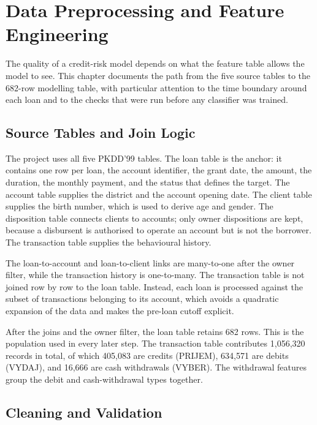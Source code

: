 \chapter{Data Preprocessing and Feature Engineering}
\label{ch:preprocessing}

The quality of a credit-risk model depends on what the feature table allows the model to see. This chapter documents the path from the five source tables to the 682-row modelling table, with particular attention to the time boundary around each loan and to the checks that were run before any classifier was trained.

\section{Source Tables and Join Logic}
\label{sec:source-join}

The project uses all five PKDD'99 tables. The loan table is the anchor: it contains one row per loan, the account identifier, the grant date, the amount, the duration, the monthly payment, and the status that defines the target. The account table supplies the district and the account opening date. The client table supplies the birth number, which is used to derive age and gender. The disposition table connects clients to accounts; only owner dispositions are kept, because a disbursent is authorised to operate an account but is not the borrower. The transaction table supplies the behavioural history.

The loan-to-account and loan-to-client links are many-to-one after the owner filter, while the transaction history is one-to-many. The transaction table is not joined row by row to the loan table. Instead, each loan is processed against the subset of transactions belonging to its account, which avoids a quadratic expansion of the data and makes the pre-loan cutoff explicit.

After the joins and the owner filter, the loan table retains 682 rows. This is the population used in every later step. The transaction table contributes 1,056,320 records in total, of which 405,083 are credits (PRIJEM), 634,571 are debits (VYDAJ), and 16,666 are cash withdrawals (VYBER). The withdrawal features group the debit and cash-withdrawal types together.

\section{Cleaning and Validation}
\label{sec:cleaning}

